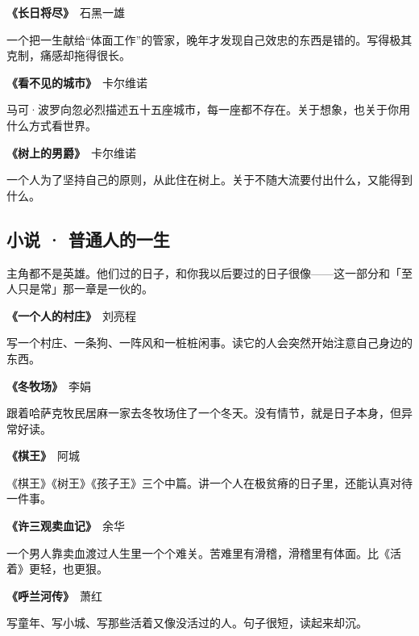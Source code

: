 \documentclass[a4paper,10pt]{article}
\renewcommand{\songti}{\CJKfamily{songpaper}}
\renewcommand{\kaishu}{\songti}
\begin{document}
\vspace{0.25\baselineskip}
\noindent\textbf{《长日将尽》}　石黑一雄\par
一个把一生献给“体面工作”的管家，晚年才发现自己效忠的东西是错的。写得极其克制，痛感却拖得很长。

\vspace{0.25\baselineskip}
\noindent\textbf{《看不见的城市》}　卡尔维诺\par
马可·波罗向忽必烈描述五十五座城市，每一座都不存在。关于想象，也关于你用什么方式看世界。

\vspace{0.25\baselineskip}
\noindent\textbf{《树上的男爵》}　卡尔维诺\par
一个人为了坚持自己的原则，从此住在树上。关于不随大流要付出什么，又能得到什么。

\vspace{0.25\baselineskip}
\subsection*{小说 · 普通人的一生}
{\kaishu\small 主角都不是英雄。他们过的日子，和你我以后要过的日子很像——这一部分和「至人只是常」那一章是一伙的。}\par
{}
\noindent\textbf{《一个人的村庄》}　刘亮程\par
写一个村庄、一条狗、一阵风和一桩桩闲事。读它的人会突然开始注意自己身边的东西。

\vspace{0.25\baselineskip}
\noindent\textbf{《冬牧场》}　李娟\par
跟着哈萨克牧民居麻一家去冬牧场住了一个冬天。没有情节，就是日子本身，但异常好读。

\vspace{0.25\baselineskip}
\noindent\textbf{《棋王》}　阿城\par
《棋王》《树王》《孩子王》三个中篇。讲一个人在极贫瘠的日子里，还能认真对待一件事。

\vspace{0.25\baselineskip}
\noindent\textbf{《许三观卖血记》}　余华\par
一个男人靠卖血渡过人生里一个个难关。苦难里有滑稽，滑稽里有体面。比《活着》更轻，也更狠。

\vspace{0.25\baselineskip}
\noindent\textbf{《呼兰河传》}　萧红\par
写童年、写小城、写那些活着又像没活过的人。句子很短，读起来却沉。
\end{document}
